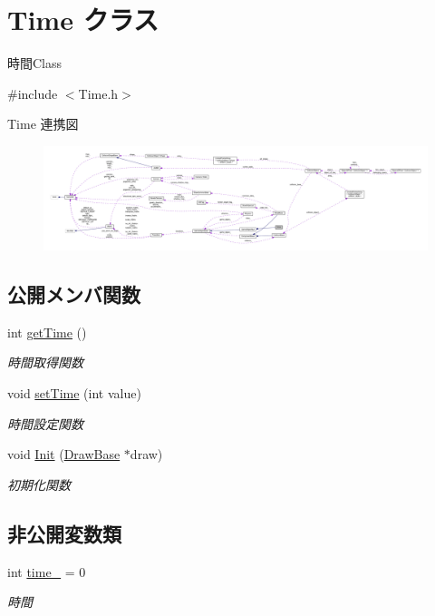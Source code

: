 \hypertarget{class_time}{}\section{Time クラス}
\label{class_time}


時間\+Class  




{\ttfamily \#include $<$Time.\+h$>$}



Time 連携図\nopagebreak
\begin{figure}[H]
\begin{center}
\leavevmode
\includegraphics[width=350pt]{class_time__coll__graph}
\end{center}
\end{figure}
\subsection*{公開メンバ関数}
\begin{DoxyCompactItemize}
\item 
int \mbox{\hyperlink{class_time_af152c078155bff82fc1a0bf402e7a5c6}{get\+Time}} ()
\begin{DoxyCompactList}\small\item\em 時間取得関数 \end{DoxyCompactList}\item 
void \mbox{\hyperlink{class_time_a3bcf296f050fbc5e22b6500a2b11f034}{set\+Time}} (int value)
\begin{DoxyCompactList}\small\item\em 時間設定関数 \end{DoxyCompactList}\item 
void \mbox{\hyperlink{class_time_a807fcbb84acb471c0cd9069b5ba0d8ad}{Init}} (\mbox{\hyperlink{class_draw_base}{Draw\+Base}} $\ast$draw)
\begin{DoxyCompactList}\small\item\em 初期化関数 \end{DoxyCompactList}\end{DoxyCompactItemize}
\subsection*{非公開変数類}
\begin{DoxyCompactItemize}
\item 
int \mbox{\hyperlink{class_time_aa857ba9a5de02d7fe3fb863719f88159}{time\+\_\+}} = 0
\begin{DoxyCompactList}\small\item\em 時間 \end{DoxyCompactList}\end{DoxyCompactItemize}
